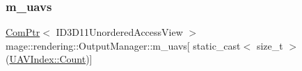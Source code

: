 \mbox{\label{classmage_1_1rendering_1_1_output_manager_abfdf92e89ef4ee4df40204e84098fdd7}} 
\subsubsection{\texorpdfstring{m\+\_\+uavs}{m\_uavs}}
{\footnotesize\ttfamily \mbox{\hyperlink{namespacemage_ae74f374780900893caa5555d1031fd79}{Com\+Ptr}}$<$ I\+D3\+D11\+Unordered\+Access\+View $>$ mage\+::rendering\+::\+Output\+Manager\+::m\+\_\+uavs\mbox{[} static\+\_\+cast$<$ size\+\_\+t $>$(\mbox{\hyperlink{classmage_1_1rendering_1_1_output_manager_a71b3797fef957312f92736f15b7ada3eae93f994f01c537c4e2f7d8528c3eb5e9}{U\+A\+V\+Index\+::\+Count}})\mbox{]}\hspace{0.3cm}{\ttfamily [private]}}

